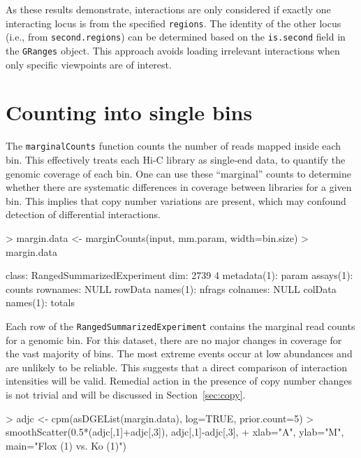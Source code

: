 \documentclass[12pt]{report}
\renewenvironment{Schunk}{\vspace{0pt}}{\vspace{0pt}}
\newcommand{\code}[1]{{\small\texttt{#1}}}
\begin{document}
As these results demonstrate, interactions are only considered if exactly one interacting locus is from the specified \code{regions}.
The identity of the other locus (i.e., from \code{second.regions}) can be determined based on the \code{is.second} field in the \code{GRanges} object.
This approach avoids loading irrelevant interactions when only specific viewpoints are of interest.

\section{Counting into single bins}
\label{sec:marginal}
The \code{marginalCounts} function counts the number of reads mapped inside each bin.
This effectively treats each Hi-C library as single-end data, to quantify the genomic coverage of each bin.
One can use these ``marginal'' counts to determine whether there are systematic differences in coverage between libraries for a given bin.
This implies that copy number variations are present, which may confound detection of differential interactions.

\begin{Schunk}
\begin{Sinput}
> margin.data <- marginCounts(input, mm.param, width=bin.size)
> margin.data
\end{Sinput}
\begin{Soutput}
class: RangedSummarizedExperiment 
dim: 2739 4 
metadata(1): param
assays(1): counts
rownames: NULL
rowData names(1): nfrags
colnames: NULL
colData names(1): totals
\end{Soutput}
\end{Schunk}

Each row of the \code{RangedSummarizedExperiment} contains the marginal read counts for a genomic bin.
For this dataset, there are no major changes in coverage for the vast majority of bins.
The most extreme events occur at low abundances and are unlikely to be reliable.
This suggests that a direct comparison of interaction intensities will be valid.
Remedial action in the presence of copy number changes is not trivial and will be discussed in Section~\ref{sec:copy}.

\begin{Schunk}
\begin{Sinput}
> adjc <- cpm(asDGEList(margin.data), log=TRUE, prior.count=5)
> smoothScatter(0.5*(adjc[,1]+adjc[,3]), adjc[,1]-adjc[,3],
+     xlab="A", ylab="M", main="Flox (1) vs. Ko (1)")
\end{Sinput}
\end{Schunk}
\end{document}
